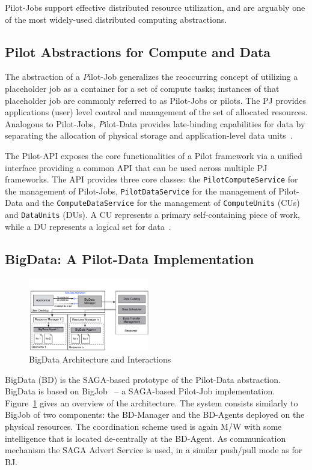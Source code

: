 \documentclass{acm_proc_article-sp}
\newcommand{\pilot}{Pilot\xspace}
\newcommand{\pilotjobs}{Pilot-Jobs\xspace}
\begin{document}
Pilot-Jobs support effective distributed resource utilization, and are arguably one of the most widely-used distributed computing abstractions. 

\subsection{Pilot Abstractions for Compute and Data}

The abstraction of a {\emph Pilot-Job} generalizes the reoccurring concept of
utilizing a placeholder job as a container for a set of compute tasks;
instances of that placeholder job are commonly referred to as Pilot-Jobs or
pilots. The PJ provides applications (user) level control and management of
the set of allocated resources. Analogous to \pilotjobs, {\emph Pilot-Data}
provides late-binding capabilities for data by separating the allocation of
physical storage and application-level data units~\cite{pstar-2012}.

The Pilot-API exposes the core functionalities of a \pilot framework via a
unified interface providing a common API that can be used across multiple PJ
frameworks. The API provides three core classes: the
\texttt{PilotComputeService} for the management of Pilot-Jobs,
\texttt{PilotDataService} for the management of Pilot-Data and the
\texttt{ComputeDataService} for the management of \texttt{ComputeUnits} (CUs)
and \texttt{DataUnits} (DUs). A CU represents a primary self-containing piece
of work, while a DU represents a logical set for data~\cite{pstar-2012}.

\subsection{BigData: A Pilot-Data Implementation}
\begin{figure}[htbp]
	\centering
		\includegraphics[width=0.47\textwidth]{figures/bigdata.pdf}
	\caption{BigData Architecture and Interactions}
	\label{fig:figures_bigdata}
\end{figure}

BigData (BD) is the SAGA-based prototype of the Pilot-Data abstraction.
BigData is based on BigJob~\cite{bigjob_web} -- a SAGA-based Pilot-Job
implementation. Figure~\ref{fig:figures_bigdata} gives an overview of the
architecture. The system consists similarly to BigJob of two components: the
BD-Manager and the BD-Agents deployed on the physical resources. The
coordination scheme used is again M/W with some intelligence that is located
de-centrally at the BD-Agent. As communication mechanism the SAGA Advert
Service is used, in a similar push/pull mode as for BJ.
\end{document}
